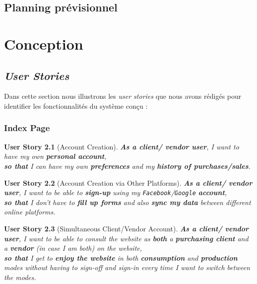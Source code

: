 \documentclass[a4paper,12pt]{book}
\theoremstyle{break}
\newtheorem{userStory}{User Story}
\theoremstyle{break}
\theoremstyle{definition}
\theoremstyle{remark}
\begin{document}
\section{Planning prévisionnel}

\chapter{Conception}
\section{\textit{User Stories}}
Dans cette section nous illustrons les \textit{user stories} que nous avons rédigés pour identifier les fonctionnalités du système conçu :
\subsection{Index Page}
\begin{userStory}[Account Creation]
\textbf{As a {\color{green} client}/{\color{red} vendor} user}, I want to have my own \textbf{personal account},\\
\indent
\textbf{so that} I can have my own \textbf{preferences} and my \textbf{history of purchases/sales}.
\end{userStory}

\begin{userStory}[Account Creation via Other Platforms]
\textbf{As a {\color{green} client}/{\color{red} vendor} user}, I want to be able to \textbf{sign-up} using my \texttt{Facebook}/\texttt{Google} \textbf{account},\\
\indent
\textbf{so that} I don't have to \textbf{fill up forms} and also \textbf{sync my data} between different online platforms.
\end{userStory}

\begin{userStory}[Simultaneous Client/Vendor Account]
\textbf{As a {\color{green} client}/{\color{red} vendor} user}, I want to be able to consult the website as \textbf{both} a \textbf{purchasing client} and a \textbf{vendor} (in case I am both) on the website,\\
\indent
\textbf{so that} I get to \textbf{enjoy the website} in both \textbf{consumption} and \textbf{production} modes without having to sign-off and sign-in every time I want to switch between the modes.
\end{userStory}
\end{document}
